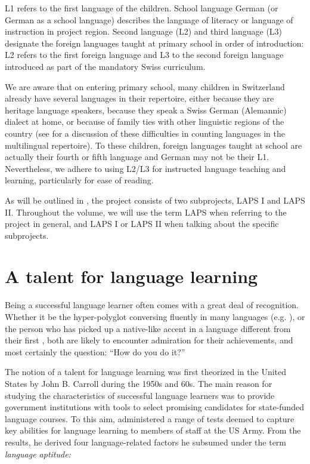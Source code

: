 \documentclass[output=paper]{langsci/langscibook}
\begin{document}
L1 refers to the first language of the children. School language German (or German as a school language) describes the language of literacy or language of instruction in project region. Second language (L2) and third language (L3) designate the foreign languages taught at primary school in order of introduction: L2 refers to the first foreign language and L3 to the second foreign language introduced as part of the mandatory Swiss curriculum. 

We are aware that on entering primary school, many children in Switzerland already have several languages in their repertoire, either because they are heritage language speakers, because they speak a Swiss German (Alemannic) dialect at home, or because of family ties with other linguistic regions of the country (see \citealt{Berthele2020} for a discussion of these difficulties in counting languages in the multilingual repertoire). To these children, foreign languages taught at school are actually their fourth or fifth language and German may not be their L1. Nevertheless, we adhere to using L2/L3 for instructed language teaching and learning, particularly for ease of reading.

As will be outlined in , the project consists of two subprojects, LAPS I and LAPS II. Throughout the volume, we will use the term LAPS when referring to the project in general, and LAPS I or LAPS II when talking about the specific subprojects.

\section{A talent for language learning} 

Being a successful language learner often comes with a great deal of recognition. Whether it be the hyper-polyglot conversing fluently in many languages (e.g. \citealt{Erard2012}), or the person who has picked up a native-like accent in a language different from their first \citep{FlegeMackay2011,ChristinerReiterer2015}, both are likely to encounter admiration for their achievements, and most certainly the question: “How do you do it?” 

The notion of a talent for language learning was first theorized in the United States by John B. Carroll during the 1950s and 60s. The main reason for studying the characteristics of successful language learners was to provide government institutions with tools to select promising candidates for state-funded language courses. To this aim, \citet{Carroll1964} administered a range of tests deemed to capture key abilities for language learning to members of staff at the US Army. From the results, he derived four language-related factors he subsumed under the term \textit{language aptitude:} 
\end{document}
